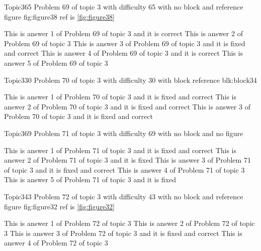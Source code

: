 \documentclass[master]{exam}
\begin{document}
\begin{problem}{Topic3}{65}
	Problem 69 of topic 3 with difficulty 65 with no block and reference figure fig:figure38 ref is \ref{fig:figure38}
	\begin{answers}
		\answer[correct] This is answer 1 of Problem 69 of topic 3 and it is correct
		\answer This is answer 2 of Problem 69 of topic 3 
		 This is answer 3 of Problem 69 of topic 3 and it is fixed and correct
		\answer[correct] This is answer 4 of Problem 69 of topic 3 and it is correct
		\answer This is answer 5 of Problem 69 of topic 3 
	\end{answers}
\end{problem}

\begin{problem}[requires=blk:block34]{Topic3}{30}
	Problem 70 of topic 3 with difficulty 30 with block reference blk:block34
	\begin{answers}
		 This is answer 1 of Problem 70 of topic 3 and it is fixed and correct
		 This is answer 2 of Problem 70 of topic 3 and it is fixed and correct
		 This is answer 3 of Problem 70 of topic 3 and it is fixed and correct
	\end{answers}
\end{problem}

\begin{problem}{Topic3}{69}
	Problem 71 of topic 3 with difficulty 69 with no block and no figure
	\begin{answers}
		 This is answer 1 of Problem 71 of topic 3 and it is fixed and correct
		\answer[fixed] This is answer 2 of Problem 71 of topic 3 and it is fixed
		 This is answer 3 of Problem 71 of topic 3 and it is fixed and correct
		\answer This is answer 4 of Problem 71 of topic 3 
		\answer[fixed] This is answer 5 of Problem 71 of topic 3 and it is fixed
	\end{answers}
\end{problem}

\begin{problem}{Topic3}{43}
	Problem 72 of topic 3 with difficulty 43 with no block and reference figure fig:figure32 ref is \ref{fig:figure32}
	\begin{answers}
		\answer This is answer 1 of Problem 72 of topic 3 
		\answer This is answer 2 of Problem 72 of topic 3 
		 This is answer 3 of Problem 72 of topic 3 and it is fixed and correct
		\answer This is answer 4 of Problem 72 of topic 3 
	\end{answers}
\end{problem}
\end{document}
